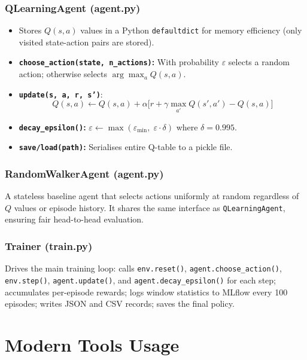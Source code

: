 \documentclass[12pt,a4paper]{report}
\begin{document}
\subsection{QLearningAgent (agent.py)}

\begin{itemize}[leftmargin=1.5em]
  \item Stores $Q(s,a)$ values in a Python \texttt{defaultdict} for
        memory efficiency (only visited state-action pairs are stored).
  \item \textbf{\texttt{choose\_action(state, n\_actions)}:} With
        probability $\varepsilon$ selects a random action; otherwise
        selects $\arg\max_a Q(s,a)$.
  \item \textbf{\texttt{update(s, a, r, s')}}:
        \[Q(s,a) \leftarrow Q(s,a) +
          \alpha\bigl[r + \gamma\max_{a'}Q(s',a') - Q(s,a)\bigr]\]
  \item \textbf{\texttt{decay\_epsilon()}:}
        $\varepsilon \leftarrow \max(\varepsilon_{\min},\;
         \varepsilon \cdot \delta)$ where $\delta = 0.995$.
  \item \textbf{\texttt{save/load(path)}:} Serialises entire Q-table to
        a pickle file.
\end{itemize}

\subsection{RandomWalkerAgent (agent.py)}

A stateless baseline agent that selects actions uniformly at random
regardless of $Q$ values or episode history.  It shares the same
interface as \texttt{QLearningAgent}, ensuring fair head-to-head
evaluation.

\subsection{Trainer (train.py)}

Drives the main training loop: calls \texttt{env.reset()},
\texttt{agent.choose\_action()}, \texttt{env.step()},
\texttt{agent.update()}, and \texttt{agent.decay\_epsilon()} for each
step; accumulates per-episode rewards; logs window statistics to MLflow
every 100 episodes; writes JSON and CSV records; saves the final policy.

\chapter{Modern Tools Usage}
\end{document}

